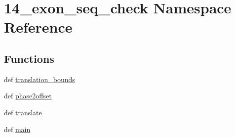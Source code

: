 \hypertarget{namespace14__exon__seq__check}{\section{14\-\_\-exon\-\_\-seq\-\_\-check Namespace Reference}
\label{namespace14__exon__seq__check}
}
\subsection*{Functions}
\begin{DoxyCompactItemize}
\item 
def \hyperlink{namespace14__exon__seq__check_a3279b7f08dccc102eca91afb314835b0}{translation\-\_\-bounds}
\item 
def \hyperlink{namespace14__exon__seq__check_adeaabe13a4d2e0bc8acc15d5f88c9dd0}{phase2offset}
\item 
def \hyperlink{namespace14__exon__seq__check_a027908957c3649a0dcf069652f994d5e}{translate}
\item 
def \hyperlink{namespace14__exon__seq__check_a655e9a57e25e0dd634598af4e9796498}{main}
\end{DoxyCompactItemize}


